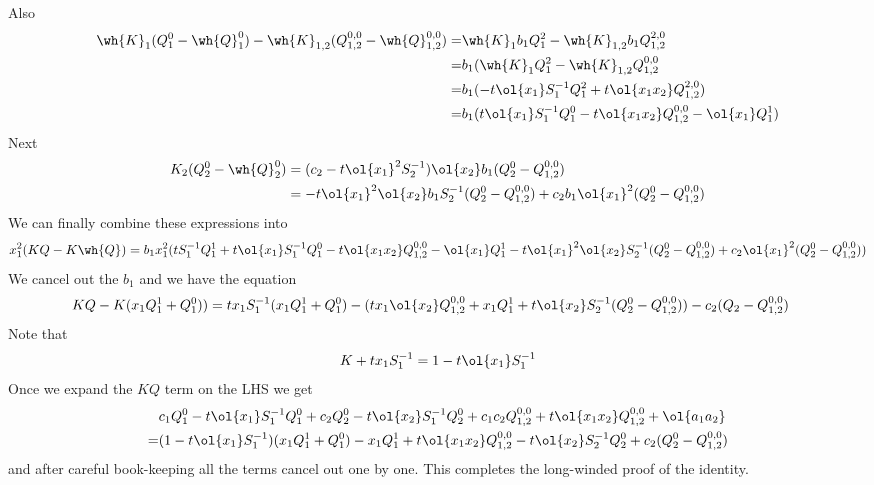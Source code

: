 Also
\begin{align}
 \wh{K}_1(Q_1^0-\wh{Q}_1^0) -\wh{K}_{1,2}(Q_{1,2}^{0,0}-\wh{Q}_{1,2}^{0,0})=&\wh{K}_1b_1Q_1^2-\wh{K}_{1,2}b_1Q_{1,2}^{2,0}\\
=&b_1(\wh{K}_1Q_1^2-\wh{K}_{1,2}Q_{1,2}^{0,0}\\
=&b_1(-t\ol{x_1}S_1^{-1}Q_1^2+t\ol{x_1x_2}Q_{1,2}^{2,0}) \\
=&b_1(t\ol{x_1}S_1^{-1}Q_1^0-t\ol{x_1x_2}Q_{1,2}^{0,0}-\ol{x_1}Q_1^1)
\end{align}
Next
\begin{align}
K_2(Q_2^0-\wh{Q}_2^0) &=(c_2 -t\ol{x_1}^2S_2^{-1})\ol{x_2}b_1(Q_2^0-Q_{1,2}^{0,0})\\ 
                                                     &=-t\ol{x_1}^2\ol{x_2}b_1S_2^{-1}(Q_2^0-Q_{1,2}^{0,0})+c_2b_1\ol{x_1}^2(Q_2^0-Q_{1,2}^{0,0})
\end{align}
We can finally combine these expressions into
\begin{align}
x_1^2(KQ-K\wh{Q}) = b_1x_1^2(tS_1^{-1}Q_1^1+t\ol{x_1}S_1^{-1}Q_1^0-t\ol{x_1x_2}Q_{1,2}^{0,0}-\ol{x_1}Q_1^1-t\ol{x_1}^2\ol{x_2}S_2^{-1}(Q_2^0-Q_{1,2}^{0,0})+c_2\ol{x_1}^2(Q_2^0-Q_{1,2}^{0,0}))
\end{align}
We cancel out the $b_1$ and we have the equation
\begin{align}
KQ-K(x_1Q_1^1+Q_1^0)) &= tx_1S_1^{-1}(x_1Q_1^1+Q_1^0) - (tx_1\ol{x_2}Q_{1,2}^{0,0}+x_1Q_1^1+t\ol{x_2}S_2^{-1}(Q_2^0-Q_{1,2}^{0,0}))-c_2(Q_2-Q_{1,2}^{0,0})
\end{align}
Note that
\begin{align}
  K+tx_1S_1^{-1} = 1- t\ol{x_1}S_1^{-1}
\end{align}
Once we expand the $KQ$ term on the LHS we get
\begin{align}
&c_1Q_1^0-t\ol{x_1}S_1^{-1}Q_1^0+c_2Q_2^0-t\ol{x_2}S_1^{-1}Q_2^0+c_1c_2Q_{1,2}^{0,0}+t\ol{x_1x_2}Q_{1,2}^{0,0}+\ol{a_1a_2}\\
=&(1-t\ol{x_1}S_1^{-1})(x_1Q_1^1+Q_1^0)-x_1Q_1^1+t\ol{x_1x_2}Q_{1,2}^{0,0}-t\ol{x_2}S_2^{-1}Q_2^0+c_2(Q_2^0-Q_{1,2}^{0,0})
\end{align}
and after careful book-keeping all the terms cancel out one by one. This completes the long-winded proof of the identity.



